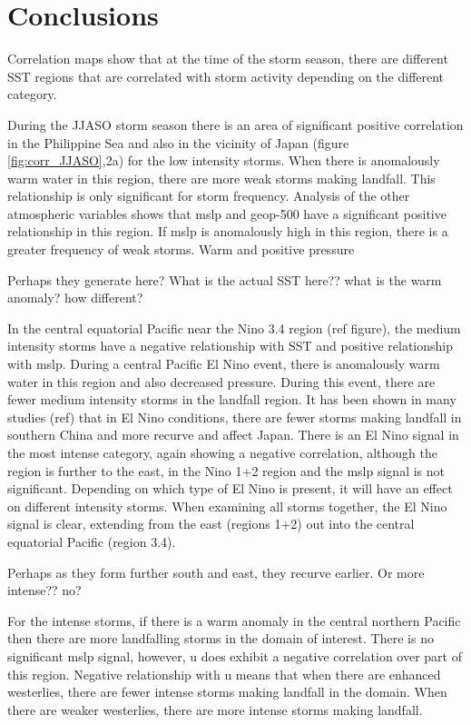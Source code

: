 \section{Conclusions}

Correlation maps show that at the time of the storm season, there are different SST regions that are correlated with storm activity depending on the different category.

During the JJASO storm season there is an area of significant positive correlation in the Philippine Sea and also in the vicinity of Japan (figure \ref{fig:corr_JJASO},2a) for the low intensity storms. When there is anomalously warm water in this region, there are more weak storms making landfall. This relationship is only significant for storm frequency. Analysis of the other atmospheric variables shows that mslp and geop-500 have a significant positive relationship in this region. If mslp is anomalously high in this region, there is a greater frequency of weak storms. Warm and positive pressure

Perhaps they generate here? What is the actual SST here?? what is the warm anomaly? how different?

In the central equatorial Pacific near the Nino 3.4 region (ref figure), the medium intensity storms have a negative relationship with SST and positive relationship with mslp. During a central Pacific El Nino event, there is anomalously warm water in this region and also decreased pressure. During this event, there are fewer medium intensity storms in the landfall region. It has been shown in many studies (ref) that in El Nino conditions, there are fewer storms making landfall in southern China and more recurve and affect Japan. There is an El Nino signal in the most intense category, again showing a negative correlation, although the region is further to the east, in the Nino 1+2 region and the mslp signal is not significant. Depending on which type of El Nino is present, it will have an effect on different intensity storms.
When examining all storms together, the El Nino signal is clear, extending from the east (regions 1+2) out into the central equatorial Pacific (region 3.4).

Perhaps as they form further south and east, they recurve earlier. Or more intense?? no?

For the intense storms, if there is a warm anomaly in the central northern Pacific then there are more landfalling storms in the domain of interest. There is no significant mslp signal, however, u does exhibit a negative correlation over part of this region. Negative relationship with u means that when there are enhanced westerlies, there are fewer intense storms making landfall in the domain. When there are weaker westerlies, there are more intense storms making landfall.

